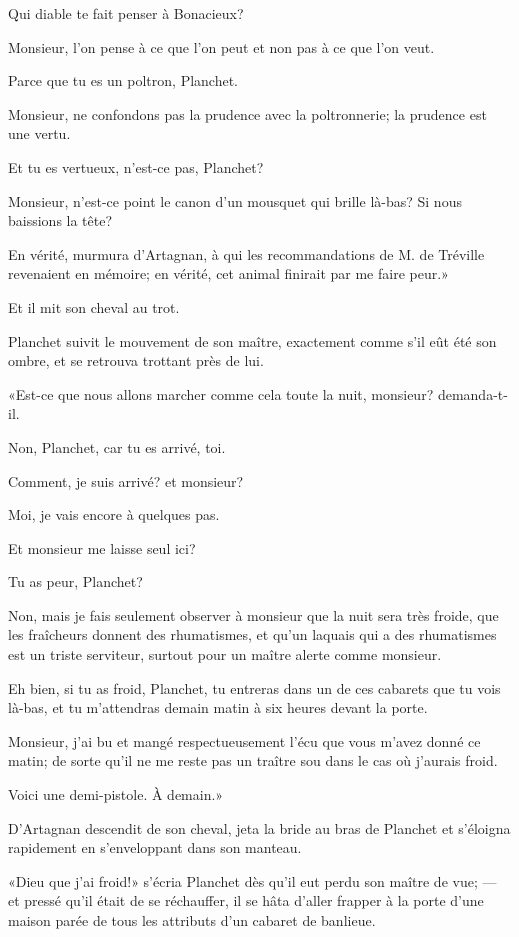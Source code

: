 \speak  Qui diable te fait penser à Bonacieux? 

\speak  Monsieur, l'on pense à ce que l'on peut et non pas à ce que l'on veut. 

\speak  Parce que tu es un poltron, Planchet. 

\speak  Monsieur, ne confondons pas la prudence avec la poltronnerie; la prudence est une vertu. 

\speak  Et tu es vertueux, n'est-ce pas, Planchet? 

\speak  Monsieur, n'est-ce point le canon d'un mousquet qui brille là-bas? Si nous baissions la tête? 

\speak  En vérité, murmura d'Artagnan, à qui les recommandations de M. de Tréville revenaient en mémoire; en vérité, cet animal finirait par me faire peur.» 

Et il mit son cheval au trot. 

Planchet suivit le mouvement de son maître, exactement comme s'il eût été son ombre, et se retrouva trottant près de lui. 

«Est-ce que nous allons marcher comme cela toute la nuit, monsieur? demanda-t-il. 

\speak  Non, Planchet, car tu es arrivé, toi. 

\speak  Comment, je suis arrivé? et monsieur? 

\speak  Moi, je vais encore à quelques pas. 

\speak  Et monsieur me laisse seul ici? 

\speak  Tu as peur, Planchet? 

\speak  Non, mais je fais seulement observer à monsieur que la nuit sera très froide, que les fraîcheurs donnent des rhumatismes, et qu'un laquais qui a des rhumatismes est un triste serviteur, surtout pour un maître alerte comme monsieur. 

\speak  Eh bien, si tu as froid, Planchet, tu entreras dans un de ces cabarets que tu vois là-bas, et tu m'attendras demain matin à six heures devant la porte. 

\speak  Monsieur, j'ai bu et mangé respectueusement l'écu que vous m'avez donné ce matin; de sorte qu'il ne me reste pas un traître sou dans le cas où j'aurais froid. 

\speak  Voici une demi-pistole. À demain.» 

D'Artagnan descendit de son cheval, jeta la bride au bras de Planchet et s'éloigna rapidement en s'enveloppant dans son manteau. 

«Dieu que j'ai froid!» s'écria Planchet dès qu'il eut perdu son maître de vue; --- et pressé qu'il était de se réchauffer, il se hâta d'aller frapper à la porte d'une maison parée de tous les attributs d'un cabaret de banlieue. 

